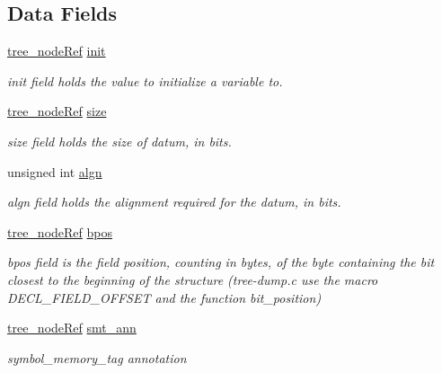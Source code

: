 \subsection*{Data Fields}
\begin{DoxyCompactItemize}
\item 
\hyperlink{tree__node_8hpp_a6ee377554d1c4871ad66a337eaa67fd5}{tree\+\_\+node\+Ref} \hyperlink{structfield__decl_afce91d65257d42bf92aba9f205586832}{init}
\begin{DoxyCompactList}\small\item\em init field holds the value to initialize a variable to. \end{DoxyCompactList}\item 
\hyperlink{tree__node_8hpp_a6ee377554d1c4871ad66a337eaa67fd5}{tree\+\_\+node\+Ref} \hyperlink{structfield__decl_ab074346467af8cad446fb25cf82a73fe}{size}
\begin{DoxyCompactList}\small\item\em size field holds the size of datum, in bits. \end{DoxyCompactList}\item 
unsigned int \hyperlink{structfield__decl_ad86e1af3e88ad5b7619263e870962585}{algn}
\begin{DoxyCompactList}\small\item\em algn field holds the alignment required for the datum, in bits. \end{DoxyCompactList}\item 
\hyperlink{tree__node_8hpp_a6ee377554d1c4871ad66a337eaa67fd5}{tree\+\_\+node\+Ref} \hyperlink{structfield__decl_a760e5edb341b17cc94020320795d9fe8}{bpos}
\begin{DoxyCompactList}\small\item\em bpos field is the field position, counting in bytes, of the byte containing the bit closest to the beginning of the structure (tree-\/dump.\+c use the macro D\+E\+C\+L\+\_\+\+F\+I\+E\+L\+D\+\_\+\+O\+F\+F\+S\+ET and the function bit\+\_\+position) \end{DoxyCompactList}\item 
\hyperlink{tree__node_8hpp_a6ee377554d1c4871ad66a337eaa67fd5}{tree\+\_\+node\+Ref} \hyperlink{structfield__decl_a66e3e30283c64fd9ac763d48c492a639}{smt\+\_\+ann}
\begin{DoxyCompactList}\small\item\em symbol\+\_\+memory\+\_\+tag annotation \end{DoxyCompactList}\end{DoxyCompactItemize}
